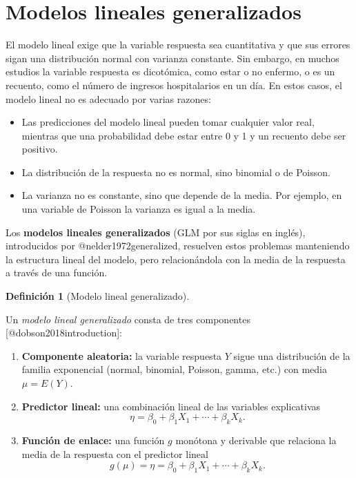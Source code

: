 \documentclass[
  spanish,
  a4paper,
]{scrreport}
\providecommand{\tightlist}{%
  \setlength{\itemsep}{0pt}\setlength{\parskip}{0pt}}
\theoremstyle{plain}
\theoremstyle{definition}
\theoremstyle{definition}
\newtheorem{definition}{Definición}[chapter]
\theoremstyle{remark}
\begin{document}
\section{Modelos lineales
generalizados}\label{modelos-lineales-generalizados-1}

El modelo lineal exige que la variable respuesta sea cuantitativa y que
sus errores sigan una distribución normal con varianza constante. Sin
embargo, en muchos estudios la variable respuesta es dicotómica, como
estar o no enfermo, o es un recuento, como el número de ingresos
hospitalarios en un día. En estos casos, el modelo lineal no es adecuado
por varias razones:

\begin{itemize}
\tightlist
\item
  Las predicciones del modelo lineal pueden tomar cualquier valor real,
  mientras que una probabilidad debe estar entre 0 y 1 y un recuento
  debe ser positivo.
\item
  La distribución de la respuesta no es normal, sino binomial o de
  Poisson.
\item
  La varianza no es constante, sino que depende de la media. Por
  ejemplo, en una variable de Poisson la varianza es igual a la media.
\end{itemize}

Los \textbf{modelos lineales generalizados} (GLM por sus siglas en
inglés), introducidos por @nelder1972generalized, resuelven estos
problemas manteniendo la estructura lineal del modelo, pero
relacionándola con la media de la respuesta a través de una función.

\begin{definition}[Modelo lineal
generalizado]\protect\hypertarget{def-modelo-lineal-generalizado}{}\label{def-modelo-lineal-generalizado}

Un \emph{modelo lineal generalizado} consta de tres componentes
{[}@dobson2018introduction{]}:

\begin{enumerate}
\def\labelenumi{\arabic{enumi}.}
\tightlist
\item
  \textbf{Componente aleatoria:} la variable respuesta \(Y\) sigue una
  distribución de la familia exponencial (normal, binomial, Poisson,
  gamma, etc.) con media \(\mu=E(Y)\).
\item
  \textbf{Predictor lineal:} una combinación lineal de las variables
  explicativas \[
  \eta = \beta_0 + \beta_1 X_1 + \cdots + \beta_k X_k.
  \]
\item
  \textbf{Función de enlace:} una función \(g\) monótona y derivable que
  relaciona la media de la respuesta con el predictor lineal \[
  g(\mu) = \eta = \beta_0 + \beta_1 X_1 + \cdots + \beta_k X_k.
  \]
\end{enumerate}

\end{definition}
\end{document}
